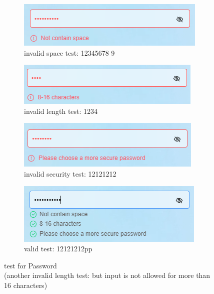 \documentclass[11pt, oneside]{article}  %
\begin{document}
\begin{figure}[H]
    \centering
    \begin{subfigure}{0.4\linewidth}
		\includegraphics[width=1\linewidth]{./pic/3.3.3.png}
        \caption{invalid space test: 12345678 9}
	\end{subfigure}
    \begin{subfigure}{0.4\linewidth}
		\includegraphics[width=1\linewidth]{./pic/3.3.4.png}
        \caption{invalid length test: 1234}
	\end{subfigure}
    \begin{subfigure}{0.4\linewidth}
		\includegraphics[width=1\linewidth]{./pic/3.4.4.png}
        \caption{invalid security test: 12121212}
	\end{subfigure}
    \begin{subfigure}{0.4\linewidth}
		\includegraphics[width=1\linewidth]{./pic/3.4.3.png}
        \caption{valid test: 12121212pp}
	\end{subfigure}
    \caption{test for Password\\(another invalid length test: but input is not allowed for more than 16 characters)}
\end{figure}
\end{document}
